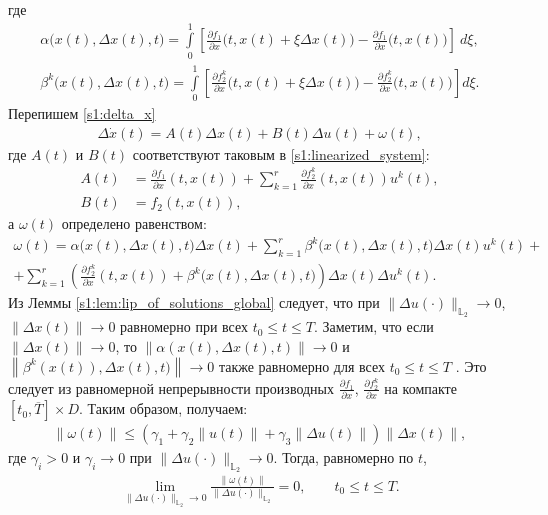 \documentclass[../main.tex]{subfiles}
\begin{document}
где
\begin{gather*}
	\alpha\Big(x(t),\Delta x(t), t\Big) = 
	\int\limits_0^1 \left[ \frac{\partial f_1}{\partial x} \Big(t, x(t) + \xi \Delta x(t)\Big) - \frac{\partial f_1}{\partial x} \Big(t, x(t)\Big) \right] \ d\xi,\\
	\beta^k\Big(x(t),\Delta x(t), t\Big) = \int\limits_0^1 \left[ \frac{\partial f_2^k}{\partial x} \Big(t, x(t) + \xi \Delta x(t)\Big) - \frac{\partial f_2^k}{\partial x} \Big(t, x(t)\Big) \right] d\xi.
\end{gather*}
Перепишем \eqref{s1:delta_x}
\begin{gather*}
	\Delta \dot{x}(t) =
	A(t) \Delta x(t) +
	B(t) \Delta u(t) +
	\omega(t),
\end{gather*}
где $A(t)$ и $B(t)$ соответствуют таковым в \eqref{s1:linearized_system}:
\begin{align*}
	A(t) &= \frac{\partial f_1}{\partial x}(t,x(t)) + \sum\limits_{k=1}^r \frac{\partial f_2^k}{\partial x}(t,x(t)) u^k(t), \\
	B(t) &= f_2(t,x(t)),
\end{align*}
а $\omega(t)$ определено равенством:
\begin{gather*}
		\omega(t) = 
		\alpha\Big(x(t),\Delta x(t), t\Big)\Delta x(t) 
		+
		\sum\limits_{k=1}^r 
		\beta^k\Big(x(t),\Delta x(t), t\Big)\Delta x(t) u^k(t) 
		+ \\ + 
		\sum\limits_{k=1}^r 
		\left(
		 \frac{\partial f_2^k}{\partial x}(t,x(t)) + \beta^k\Big(x(t),\Delta x(t), t\Big)
		\right) 
		\Delta x(t) \Delta u^k(t).
\end{gather*}
Из Леммы \ref{s1:lem:lip_of_solutions_global} следует, что при $\|\Delta u(\cdot)\|_{\mathbb{L}_2} \to 0$, $\|\Delta x(t)\| \to 0$ равномерно при всех $t_0 \leqslant t \leqslant T$.
Заметим, что если $\|\Delta x(t)\| \to 0$, то $ \left\| \alpha(x(t),\Delta x(t), t) \right\| \to 0 $ и $ \left\| \beta^k(x(t)),\Delta x(t), t) \right\| \to 0 $ также равномерно для всех $ t_0 \leqslant t \leqslant T $ .
Это следует из равномерной непрерывности производных $\frac{\partial f_1}{\partial x}$, $\frac{\partial f_2^k}{\partial x}$ на компакте $[t_0, \overline{T}] \times D$.
Таким образом, получаем:
\begin{gather*}
	\|\omega(t)\| \leqslant \left( \gamma_1 + \gamma_2 \|u(t)\| + \gamma_3 \|\Delta u(t)\| \right) \|\Delta x(t)\|,
\end{gather*}
где $\gamma_i > 0 $ и $\gamma_i \to 0 $ при $ \|\Delta u(\cdot)\|_{\mathbb{L}_2} ​\to 0$.
Тогда, равномерно по $t$,
\begin{gather}\label{s1:lim_omega}
	\lim\limits_{\|\Delta u(\cdot) \|_{\mathbb{L}_2} \to 0} \frac{ \| \omega(t) \| }{\|\Delta u(\cdot) \|_{\mathbb{L}_2}} = 0, \qquad t_0 \leqslant t \leqslant T .
\end{gather}
\end{document}
